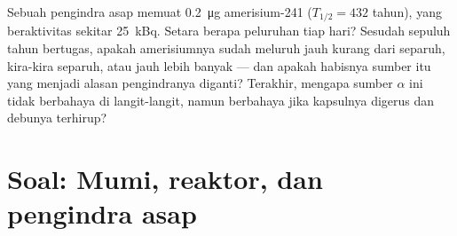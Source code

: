 \begin{exercise}[$\star\star\star$]\label{exo:g11:nucleus-radioactivity:15}
Sebuah pengindra asap memuat \qty{0.2}{\micro\gram} amerisium-241
($T_{1/2} = 432$ tahun), yang beraktivitas sekitar \qty{25}{kBq}. Setara
berapa peluruhan tiap hari? Sesudah sepuluh tahun bertugas, apakah
amerisiumnya sudah meluruh jauh kurang dari separuh, kira-kira separuh, atau
jauh lebih banyak --- dan apakah habisnya sumber itu yang menjadi alasan
pengindranya diganti? Terakhir, mengapa sumber $\alpha$ ini tidak berbahaya
di langit-langit, namun berbahaya jika kapsulnya digerus dan debunya
terhirup?
\end{exercise}

\section{Soal: Mumi, reaktor, dan pengindra asap}

